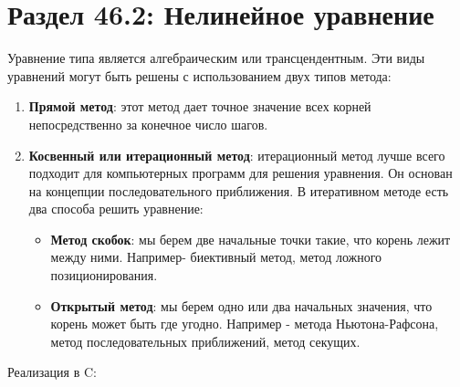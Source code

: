 \section*{Раздел 46.2: Нелинейное уравнение}
Уравнение типа  является алгебраическим или трансцендентным. Эти
виды уравнений могут быть решены с использованием двух типов метода:
\begin{enumerate}
    \item \textbf{Прямой метод}: этот метод дает точное значение всех корней
непосредственно за конечное число шагов.
    \item \textbf{Косвенный или итерационный метод}: итерационный метод лучше всего
подходит для компьютерных программ для решения уравнения. Он основан
на концепции последовательного приближения. В итеративном методе есть
два способа решить уравнение:
    \begin{itemize}
        \item[\circ]\textbf{Метод скобок}: мы берем две начальные точки такие, что корень лежит
между ними. Например- биективный метод, метод ложного
позиционирования.
        \item[\circ]\textbf{Открытый метод}: мы берем одно или два начальных значения, что корень
может быть где угодно. Например - метода Ньютона-Рафсона, метод
последовательных приближений, метод секущих.
    \end{itemize}
\end{enumerate}
\vspace{\baselineskip}
Реализация в C:
\vspace{\baselineskip}
\vspace{\baselineskip}
